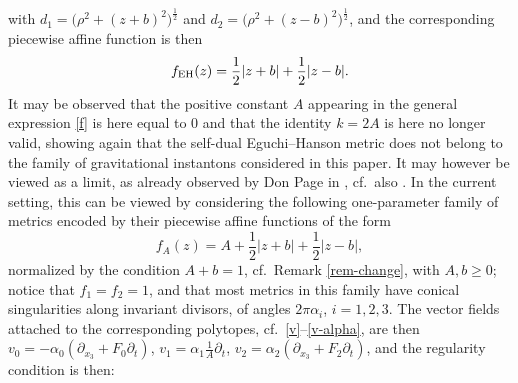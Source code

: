 \documentclass[10pt,a4paper]{amsart}
\numberwithin{equation}{section}
\begin{document}
with $d _1 = \big(\rho ^2 + (z + b) ^2\big)^{\frac{1}{2}}$ and $d_2 = \big(\rho ^2 + (z - b) ^2\big)^{\frac{1}{2}}$, and the corresponding piecewise affine function is then
\[ f_{\rm EH} (z) = \frac{1}{2} |z + b| + \frac{1}{2} |z - b|. \]
It may be observed that the positive constant $A$ appearing in the general expression \eqref{f} is here equal to $0$ and that the identity $k = 2 A$ is here no longer valid, showing again that the self-dual Eguchi--Hanson metric does not belong to the family of gravitational instantons considered in this paper. It may however be viewed as a limit, as already observed by Don Page in \cite{P}, cf.~also \cite[Section~7.2]{BG}.
In the current setting, this can be viewed by considering the following one-parameter family of metrics encoded by their piecewise affine functions of the form
\[ f _A (z) = A + \frac{1}{2} |z + b| + \frac{1}{2} |z - b|, \]
 normalized by the condition $A + b = 1$, cf.\ Remark \ref{rem-change}, with $A, b \geq 0$; notice that $f_1 = f _2 = 1$, and that most metrics in this family have conical singularities along invariant divisors, of angles $2 \pi \alpha _i$, $i = 1, 2, 3$. The vector fields attached to the corresponding polytopes, cf.\ \eqref{v}--\eqref{v-alpha}, are then $v_0 = - \alpha _0 (\partial _{x_3} + F _0 \partial _t)$, $v _1 = \alpha _1 \frac{1}{A} \partial _t$, $v _2 = \alpha _2 (\partial _{x_3} + F _2 \partial _t)$, and the regularity condition is then:
\end{document}
